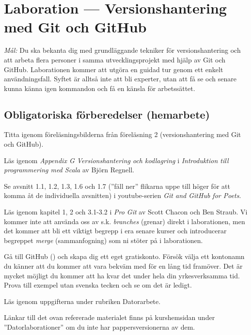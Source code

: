 \def\reponame{dod-lab2}

\section{Laboration  --- Versionshantering med Git och GitHub}

\emph{Mål:} Du ska bekanta dig med grundläggande tekniker för versionshantering och att arbeta flera personer i samma utvecklingsprojekt med hjälp av Git och GitHub. Laborationen kommer att utgöra en guidad tur genom ett enkelt användningsfall. Syftet är alltså inte att bli experter, utan att få se och senare kunna känna igen kommandon och få en känsla för arbetssättet.

\subsection*{Obligatoriska förberedelser (hemarbete)}
\begin{Hemarbete}\firmlist
	\item Titta igenom föreläsningsbilderna från föreläsning 2 (versionshantering med Git och GitHub).
	\item Läs igenom \emph{Appendix G Versionshantering och kodlagring} i \emph{Introduktion till programmering med Scala} av Björn Regnell.
	\item Se avsnitt 1.1, 1.2, 1.3, 1.6 och 1.7 (''fäll ner'' flikarna uppe till höger för att komma åt de individuella avsnitten) i youtube-serien \emph{Git and GitHub for Poets}.
	\item Läs igenom kapitel 1, 2 och 3.1-3.2 i \emph{Pro Git} av Scott Chacon och Ben Straub. Vi kommer inte att använda oss av s.k. \emph{branches} (grenar) direkt i laborationen, men det kommer att bli ett viktigt begrepp i era senare kurser och introducerar begreppet \emph{merge} (sammanfogning) som ni stöter på i laborationen.
	\item Gå till GitHub () och skapa dig ett eget gratiskonto. Försök välja ett kontonamn du känner att du kommer att vara bekväm med för en lång tid framöver. Det är mycket möjligt du kommer att ha kvar det under hela din yrkesverksamma tid. Prova till exempel  utan svenska tecken och se om det är ledigt.
	\item Läs igenom uppgifterna under rubriken Datorarbete.
\end{Hemarbete}
Länkar till det ovan refererade materialet finns på kurshemsidan under  ''Datorlaborationer'' om du inte har pappersversionerna av dem.

